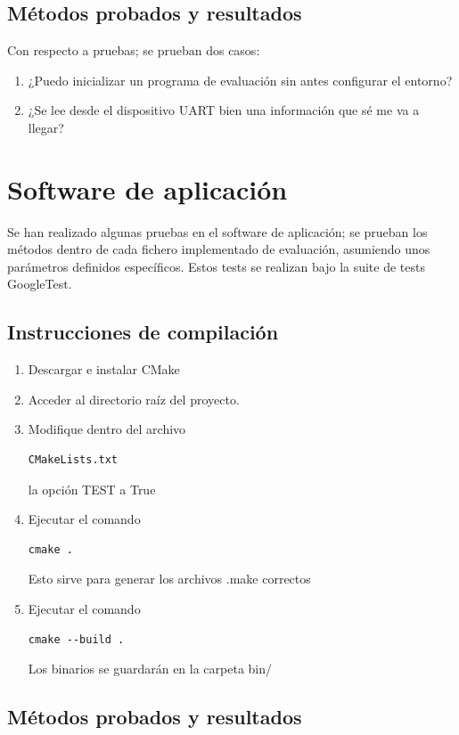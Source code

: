 \documentclass[12pt,a4paper,twoside,openright]{book}
\begin{document}
\subsection{Métodos probados y resultados}

Con respecto a pruebas; se prueban dos casos:

\begin{enumerate}
  \item ¿Puedo inicializar un programa de evaluación sin antes configurar el entorno?
  \item ¿Se lee desde el dispositivo UART bien una información que sé me va a llegar?
\end{enumerate}

\section{Software de aplicación}

Se han realizado algunas pruebas en el software de aplicación; se prueban los métodos dentro de cada fichero implementado de evaluación, asumiendo unos parámetros definidos específicos. Estos tests se realizan bajo la suite de tests GoogleTest.

\subsection{Instrucciones de compilación}
  
  \begin{enumerate}
  \item Descargar e instalar CMake
  \item Acceder al directorio raíz del proyecto.
  \item Modifique dentro del archivo \begin{verbatim}CMakeLists.txt\end{verbatim} la opción TEST a True
  \item Ejecutar el comando \begin{verbatim}cmake .\end{verbatim} Esto sirve para generar los archivos .make correctos 
  \item Ejecutar el comando \begin{verbatim}cmake --build .\end{verbatim} Los binarios se guardarán en la carpeta bin/
  \end{enumerate}

\subsection{Métodos probados y resultados}
\end{document}
